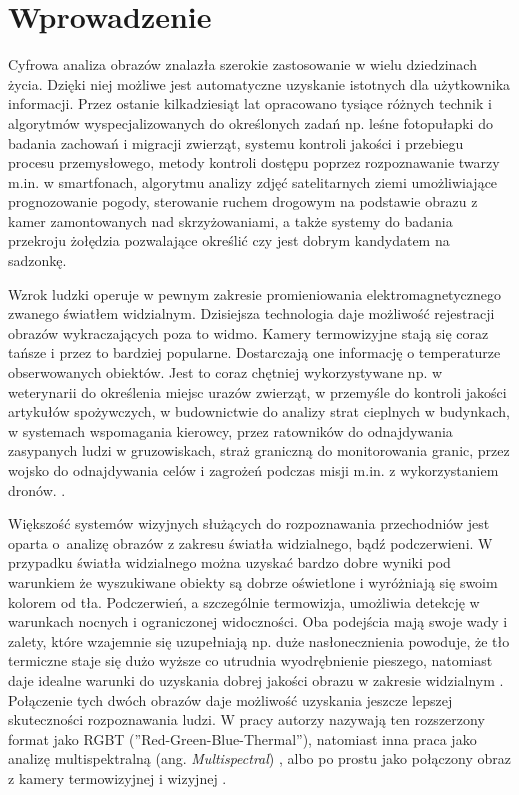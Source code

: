 \chapter{Wprowadzenie}

Cyfrowa analiza obrazów znalazła szerokie zastosowanie w wielu dziedzinach życia. 
Dzięki niej możliwe jest automatyczne uzyskanie istotnych dla użytkownika informacji. 
Przez ostanie kilkadziesiąt lat opracowano tysiące różnych technik i algorytmów wyspecjalizowanych do określonych zadań np. leśne fotopułapki do badania zachowań i migracji zwierząt, systemu kontroli jakości i przebiegu procesu przemysłowego, metody kontroli dostępu poprzez rozpoznawanie twarzy m.in. w smartfonach, algorytmu analizy zdjęć satelitarnych ziemi umożliwiające prognozowanie pogody, sterowanie ruchem drogowym na podstawie obrazu z kamer zamontowanych nad skrzyżowaniami, a także systemy do badania przekroju żołędzia pozwalające określić czy jest dobrym kandydatem na sadzonkę.


Wzrok ludzki operuje w pewnym zakresie promieniowania elektromagnetycznego zwanego światłem widzialnym. 
Dzisiejsza technologia daje możliwość rejestracji obrazów wykraczających poza to widmo. 
Kamery termowizyjne stają się coraz tańsze i przez to bardziej popularne. 
Dostarczają one informację o temperaturze obserwowanych obiektów. 
Jest to coraz chętniej wykorzystywane np. w weterynarii do określenia miejsc urazów zwierząt, w przemyśle do kontroli jakości artykułów spożywczych, w budownictwie do analizy strat cieplnych w budynkach, w systemach wspomagania kierowcy, przez ratowników do odnajdywania zasypanych ludzi w gruzowiskach, straż graniczną do monitorowania granic, przez wojsko do odnajdywania celów i zagrożeń podczas misji m.in. z wykorzystaniem dronów. \cite{gade2014thermal}. 

Większość systemów wizyjnych służących do rozpoznawania przechodniów jest oparta o~analizę obrazów z zakresu światła widzialnego, bądź podczerwieni. 
W przypadku światła widzialnego można uzyskać bardzo dobre wyniki pod warunkiem że wyszukiwane obiekty są dobrze oświetlone i wyróżniają się swoim kolorem od tła. 
Podczerwień, a szczególnie termowizja, umożliwia detekcję w warunkach nocnych i ograniczonej widoczności.
Oba podejścia mają swoje wady i zalety, które wzajemnie się uzupełniają np. duże nasłonecznienia powoduje, że tło termiczne staje się dużo wyższe co utrudnia wyodrębnienie pieszego, natomiast daje idealne warunki do uzyskania dobrej jakości obrazu w zakresie widzialnym \cite{lee2015robust}. 
Połączenie tych dwóch obrazów daje możliwość uzyskania jeszcze lepszej skuteczności rozpoznawania ludzi. 
W pracy\cite{st2007combination} autorzy nazywają ten rozszerzony format jako RGBT (''Red-Green-Blue-Thermal''), natomiast inna praca jako analizę multispektralną (ang. \textit{Multispectral}) \cite{hwang2015multispectral}, albo po prostu jako połączony obraz z kamery termowizyjnej i wizyjnej \cite{lee2015robust}. 

